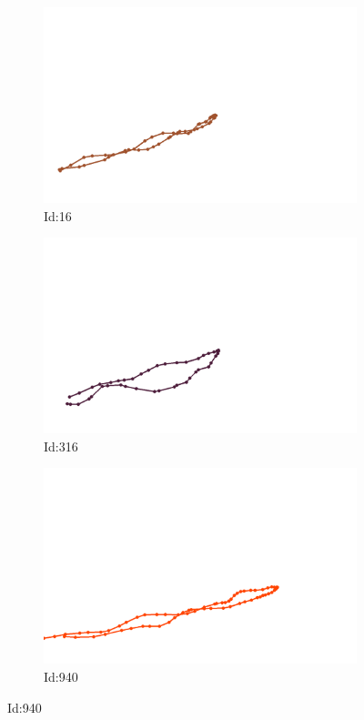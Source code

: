 \documentclass[12pt,twoside]{report}
\begin{document}
\begin{figure}
\centering
\begin{subfigure}[b]{0.20\textwidth}
\centering
\includegraphics[width=\textwidth]{../../trajectories/16.png}
\caption{Id:16}
\end{subfigure}
\begin{subfigure}[b]{0.20\textwidth}
\centering
\includegraphics[width=\textwidth]{../../trajectories/316.png}
\caption{Id:316}
\end{subfigure}
\begin{subfigure}[b]{0.20\textwidth}
\centering
\includegraphics[width=\textwidth]{../../trajectories/940.png}
\caption{Id:940}
\end{subfigure}
\end{figure}
\end{document}
